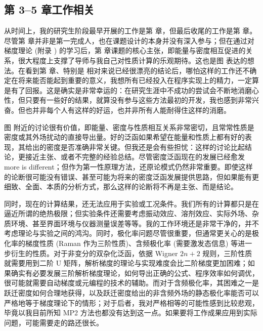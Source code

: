 \subsection*{第 3--5 章工作相关}

从时间上，我的研究生阶段最早开展的工作是第  章，但最后收尾的工作是第  章。尽管第  章并非是第一完成人，也在课题设计的本身并没有深入参与；但在通过对梯度理论 (附录 ) 的学习后，第  章课题的核心主张，即能量与密度相互促进的关系，很大程度上支撑了导师与我自己对性质计算的乐观期待。这也是图  表达的想法。在看到第  章、特别是  相对来说已经很漂亮的结论后，哪怕这样的工作还不确定在将来能否能起到重要的意义，我想所有已经投入在程序实现上的精力，一定算是有了回报。这是确实是非常幸运的：在研究生涯中不成功的尝试会不断地消磨心性，但只要有一些好的结果，就算没有参与这些方法最初的开发，我也感到非常兴奋。但也并非每个人有这样的好运，也并非所有人能耐得住这样的消磨。

图  附近的讨论很有价值，即能量、密度与性质相互关系非常密切，且常常性质是密度或其外场扰动的直接导出量。好的泛函如果希望在能量和性质上都有好的表现，其给出的密度是否准确非常关键。但我还是会有些担忧：这样的讨论比起结论，更接近主张、或者不完整的经验总结。尽管密度泛函现在的发展已经愈发 more is different\cite{Anderson-Anderson.S.1972}；但作为第一性原理方法，还原论模式仍然非常重要。即使这样的论断很可能没有错误、甚至可能为将来的密度泛函发展提供思路，但如果能有更细致、全面、本质的分析方式，那么这样的论断将不再是主张、而是结论。

同时，现在的计算结果，还无法应用于实验或工况条件。我们所有的计算都只是在逼近所谓的绝热极限；但实验条件还需要考虑振动效应、溶剂效应、实际外场、杂质环境、甚至界面环境与仪器测量误差等等\cite{Mata-Suhm.ACIE.2017, Varandas-Varandas.ARPC.2018}。我的工作环境还是非常干净的，并不考虑理论与实验之间的鸿沟。同时，极化率问题尽管很重要，但通常更关心的是极化率的梯度性质 (Raman 作为三阶性质)、含频极化率 (需要激发态信息) 等进一步衍生的性质。对于非变分的双杂化泛函，依据 Wigner $2n+2$ 规则，三阶性质就需要用到二阶 U 矩阵，解析梯度的理论与实现难度会比二阶梯度更加困难；如果确实有必要发展三阶解析梯度理论，如何导出正确的公式、程序效率如何调优，很可能就需要自动梯度或元编程的技术的辅助。而对于含频极化率，其困难之一是跃迁密度如何合理地获得，以及跃迁密度给出的非含频外场的静态极化率能否可以严格地等于梯度理论下的情形；对于后者，我对严格相等的可能性感到比较悲观，毕竟以我目前所知 MP2 方法也都没有达到这一点。如果要将工作成果应用到实际问题，可能需要走的路还很长。
